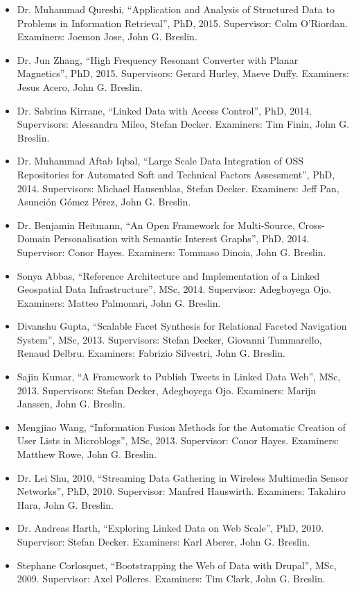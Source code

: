 \documentclass[10pt,a4paper]{res} %
\begin{document}
\begin{resume}
\begin{itemize}
\item Dr. Muhammad Qureshi, ``Application and Analysis of Structured Data to Problems in Information Retrieval'', PhD, 2015. Supervisor: Colm O'Riordan. Examiners: Joemon Jose, John G. Breslin.
\item Dr. Jun Zhang, ``High Frequency Resonant Converter with Planar Magnetics'', PhD, 2015. Supervisors: Gerard Hurley, Maeve Duffy. Examiners: Jesus Acero, John G. Breslin.
\item Dr. Sabrina Kirrane, ``Linked Data with Access Control'', PhD, 2014. Supervisors: Alessandra Mileo, Stefan Decker. Examiners: Tim Finin, John G. Breslin.
\item Dr. Muhammad Aftab Iqbal, ``Large Scale Data Integration of OSS Repositories for Automated Soft and Technical Factors Assessment'', PhD, 2014. Supervisors: Michael Hausenblas, Stefan Decker. Examiners: Jeff Pan, Asunci\'{o}n G\'{o}mez P\'{e}rez, John G. Breslin.
\item Dr. Benjamin Heitmann, ``An Open Framework for Multi-Source, Cross-Domain Personalisation with Semantic Interest Graphs'', PhD, 2014. Supervisor: Conor Hayes. Examiners: Tommaso Dinoia, John G. Breslin.
\item Sonya Abbas, ``Reference Architecture and Implementation of a Linked Geospatial Data Infrastructure'', MSc, 2014. Supervisor: Adegboyega Ojo. Examiners: Matteo Palmonari, John G. Breslin.
\item Divanshu Gupta, ``Scalable Facet Synthesis for Relational Faceted Navigation System'', MSc, 2013. Supervisors: Stefan Decker, Giovanni Tummarello, Renaud Delbru. Examiners: Fabrizio Silvestri, John G. Breslin.
\item Sajin Kumar, ``A Framework to Publish Tweets in Linked Data Web'', MSc, 2013. Supervisors: Stefan Decker, Adegboyega Ojo. Examiners: Marijn Janssen, John G. Breslin.
\item Mengjiao Wang, ``Information Fusion Methods for the Automatic Creation of User Lists in Microblogs'', MSc, 2013. Supervisor: Conor Hayes. Examiners: Matthew Rowe, John G. Breslin.
\item Dr. Lei Shu, 2010, ``Streaming Data Gathering in Wireless Multimedia Sensor Networks'', PhD, 2010. Supervisor: Manfred Hauswirth. Examiners: Takahiro Hara, John G. Breslin.
\item Dr. Andreas Harth, ``Exploring Linked Data on Web Scale'', PhD, 2010. Supervisor: Stefan Decker. Examiners: Karl Aberer, John G. Breslin.
\item Stephane Corlosquet, ``Bootstrapping the Web of Data with Drupal'', MSc, 2009. Supervisor: Axel Polleres. Examiners: Tim Clark, John G. Breslin.
\end{itemize}


\end{resume}
\end{document}
